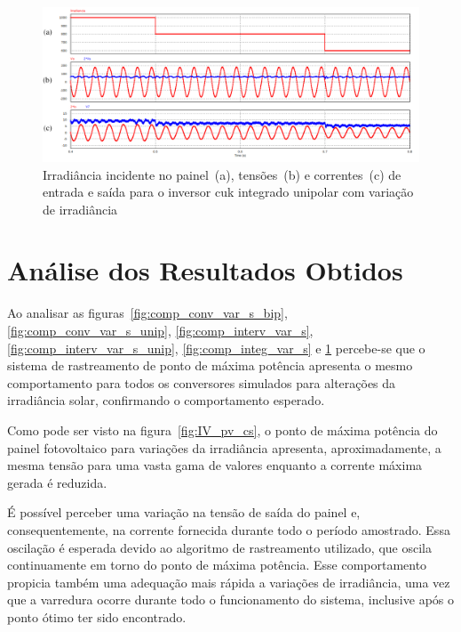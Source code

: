 \documentclass[
	12pt,				%
	openright,			%
	twoside,			%
	a4paper,			%
	english,			%
	french,				%
	spanish,			%
	brazil,				%
	]{abntex2}
\begin{document}
\begin{figure}[H]%
	\captionsetup{justification=centering}
	\centering
		\includegraphics[width= \linewidth]{comp_integ_var_s_unip}
		\caption{Irradiância incidente no painel~(a), tensões~(b) e correntes~(c) de entrada e saída para o inversor cuk integrado unipolar com variação de irradiância}
		\label{fig:comp_integ_var_s_unip}
\end{figure}


\chapter{Análise dos Resultados Obtidos}


Ao analisar as figuras~\ref{fig:comp_conv_var_s_bip}, \ref{fig:comp_conv_var_s_unip}, \ref{fig:comp_interv_var_s}, \ref{fig:comp_interv_var_s_unip}, \ref{fig:comp_integ_var_s} e \ref{fig:comp_integ_var_s_unip} percebe-se que o sistema de rastreamento de ponto de máxima potência apresenta o mesmo comportamento para todos os conversores simulados para alterações da irradiância solar, confirmando o comportamento esperado.

Como pode ser visto na figura~\ref{fig:IV_pv_cs}, o ponto de máxima potência do painel fotovoltaico para variações da irradiância apresenta, aproximadamente, a mesma tensão para uma vasta gama de valores enquanto a corrente máxima gerada é reduzida. 

É possível perceber uma variação na tensão de saída do painel e, consequentemente, na corrente fornecida durante todo o período amostrado. Essa oscilação é esperada devido ao algoritmo de rastreamento utilizado, que oscila continuamente em torno do ponto de máxima potência. Esse comportamento propicia também uma adequação mais rápida a variações de irradiância, uma vez que a varredura ocorre durante todo o funcionamento do sistema, inclusive após o ponto ótimo ter sido encontrado.
\end{document}
